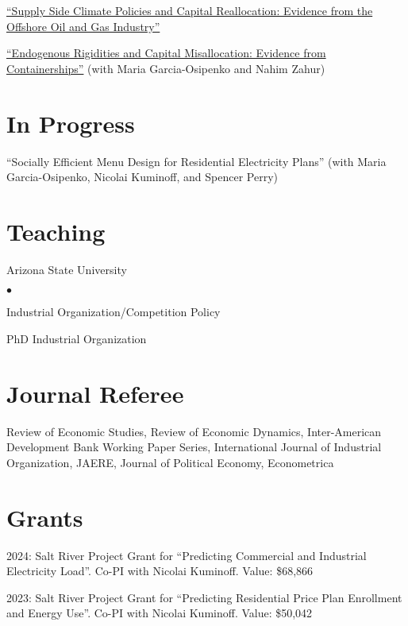 \documentclass[margin,line]{res}
\newenvironment{list1}{
  \begin{list}{\ding{113}}{%
      \setlength{\itemsep}{.025in}
      \setlength{\parsep}{0in} \setlength{\parskip}{0in}
      \setlength{\topsep}{0in} \setlength{\partopsep}{0in}
      \setlength{\leftmargin}{0.17in}}}{\end{list}}
\newenvironment{list2}{
  \begin{list}{$\bullet$}{%
      \setlength{\itemsep}{0in}
      \setlength{\parsep}{0in} \setlength{\parskip}{0in}
      \setlength{\topsep}{0in} \setlength{\partopsep}{0in}
      \setlength{\leftmargin}{0.2in}}}{\end{list}}
\begin{document}
\begin{resume}
\begin{list1}
\item[] \href{https://nvreug.github.io/paper/oil_incomplete.pdf}{``Supply Side Climate Policies and Capital Reallocation:
Evidence from the Offshore Oil and Gas Industry''}

\item[] \href{https://www.dropbox.com/scl/fo/vvihiqs76w4aa8xec7yk0/AFoFgQWKSBmpVXtBniPrXCk?rlkey=qfbev74pab0m15amlw88qbpt0&e=2&st=66940rp0&dl=0}{``Endogenous Rigidities and Capital Misallocation: Evidence from Containerships''} (with Maria Garcia-Osipenko and Nahim Zahur)

\end{list1}

\section{In Progress}
\begin{list1}
	\item[] ``Socially Efficient Menu Design for Residential Electricity Plans'' (with Maria Garcia-Osipenko, Nicolai Kuminoff, and Spencer Perry)
\end{list1}

\section{Teaching}
\begin{list1}
	\item[] Arizona State University
	\begin{list2}
		\item[] Industrial Organization/Competition Policy 
		\item[] PhD Industrial Organization 
	\end{list2}
\end{list1}

\section{Journal Referee}
\begin{list1}
	\item[] Review of Economic Studies, Review of Economic Dynamics, Inter-American Development Bank Working Paper Series, International Journal of Industrial Organization, JAERE, Journal of Political Economy, Econometrica
\end{list1}

\section{Grants}
\begin{list1}
	\item[] 2024: Salt River Project Grant for ``Predicting Commercial and Industrial Electricity Load''. Co-PI with Nicolai Kuminoff. Value: \$68,866
	\item[] 2023: Salt River Project Grant for ``Predicting Residential Price Plan Enrollment and Energy Use''. Co-PI with Nicolai Kuminoff. Value: \$50,042
\end{list1}


\end{resume}
\end{document}
